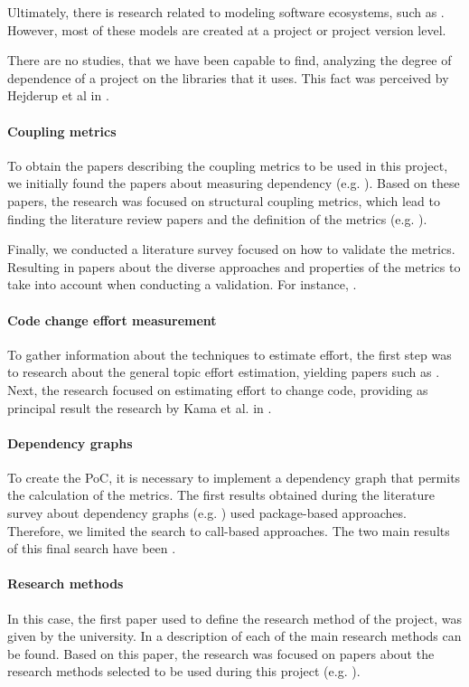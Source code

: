 Ultimately, there is research related to modeling software ecosystems, such as \cite{decan2017empirical, hejderup2015dependencies, kikas2017structure}. However, most of these models are created at a project or project version level.

\bigskip\noindent
There are no studies, that we have been capable to find, analyzing the degree of dependence of a project on the libraries that it uses. This fact was perceived by Hejderup et al in \cite{hejderup2018software}.

\paragraph{Coupling metrics}
To obtain the papers describing the coupling metrics to be used in this project, we initially found the papers about measuring dependency (e.g. \cite{cataldo2009software, poshyvanyk2006conceptual}). Based on these papers, the research was focused on structural coupling metrics, which lead to finding the literature review papers and the definition of the metrics (e.g. \cite{briand1997investigation, briand1999unified, harrison1998coupling}).

Finally, we conducted a literature survey focused on how to validate the metrics. Resulting in papers about the diverse approaches and properties of the metrics to take into account when conducting a validation. For instance, \cite{meneely2013validating, roche1994software, srinivasan2014software}.

\paragraph{Code change effort measurement}
To gather information about the techniques to estimate effort, the first step was to research about the general topic effort estimation, yielding papers such as \cite{sharma2011analysis}.
Next, the research focused on estimating effort to change code, providing as principal result the research by Kama et al. in \cite{kama2013integrated, kama2014cochcomo}.

\paragraph{Dependency graphs}
To create the PoC, it is necessary to implement a dependency graph that permits the calculation of the metrics. The first results obtained during the literature survey about dependency graphs (e.g. \cite{kikas2017structure, kula2017modeling}) used package-based approaches. Therefore, we limited the search to call-based approaches. The two main results of this final search have been \cite{hejderup2018prazi, hejderup2018software}.

\paragraph{Research methods}
In this case, the first paper used to define the research method of the project, was given by the university. In \cite{easterbrook2008selecting} a description of each of the main research methods can be found. Based on this paper, the research was focused on papers about the research methods selected to be used during this project (e.g. \cite{wieringa2012technical}).
